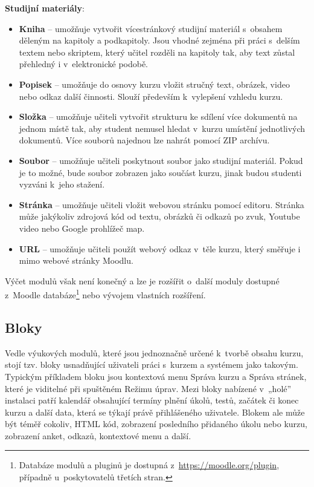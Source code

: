 \documentclass[
print,
  11pt,
  table,   
  nolof,    
  nolot,
  oneside,
  draft
]{fithesis3}
\begin{document}
\textbf{Studijní materiály}:
\begin{itemize}
\item \textbf{Kniha} -- umožňuje vytvořit vícestránkový studijní materiál s~obsahem děleným na kapitoly a podkapitoly.  Jsou vhodné zejména při práci s~delším textem nebo skriptem, který učitel rozděli na kapitoly tak, aby text zůstal přehledný i v~elektronické podobě.
\item \textbf{Popisek} -- umožňuje do osnovy kurzu vložit stručný text, obrázek, video nebo odkaz další činnosti. Slouží především k~vylepšení vzhledu kurzu.
\item \textbf{Složka} -- umožňuje učiteli vytvořit strukturu ke sdílení více dokumentů na jednom místě tak, aby student nemusel hledat v~kurzu umístění jednotlivých dokumentů. Více souborů najednou lze nahrát pomocí ZIP archívu.
\item \textbf{Soubor} -- umožňuje učiteli poskytnout soubor jako studijní materiál. Pokud je to možné, bude soubor zobrazen jako součást kurzu, jinak budou studenti vyzváni k~jeho stažení.
\item \textbf{Stránka} -- umožňuje učiteli vložit webovou stránku pomocí editoru. Stránka může jakýkoliv zdrojová kód  od textu, obrázků či odkazů po zvuk, Youtube video nebo Google prohlížeč map.
\item \textbf{URL} -- umožňuje učiteli použít webový odkaz v~těle kurzu, který směřuje i mimo web\-ové stránky Moodlu.
\end{itemize}
Výčet modulů však není konečný a lze je rozšířit o~další moduly dostupné z~Moodle databáze\footnote{Databáze modulů a pluginů je dostupná z~\url{https://moodle.org/plugin}, případně u~poskytovatelů třetích stran.} nebo vývojem vlastních rozšíření.

		\subsection{Bloky}
Vedle výukových modulů, které jsou jednoznačně určené k~tvorbě obsahu kurzu, stojí tzv. bloky usnadňující uživateli práci s~kurzem a systémem jako takovým. Typickým příkladem bloku jsou kontextová menu Správa kurzu a Správa stránek, které je viditelné při spuštěném Režimu úprav. Mezi bloky nabízené v~„holé” instalaci patří kalendář obsahující termíny plnění úkolů, testů, začátek či konec kurzu a další data, která se týkají právě přihlášeného uživatele. Blokem ale může být téměř cokoliv, HTML kód, zobrazení posledního přidaného úkolu nebo kurzu, zobrazení anket, odkazů, kontextové menu a další.
\end{document}

